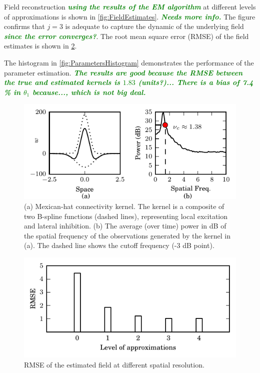 \documentclass[journal,a4paper]{IEEEtran}
\newcommand{\dean}[1]{\textsf{\emph{\textbf{\textcolor{green}{#1}}}}}
\begin{document}
Field reconstruction \dean{using the results of the EM algorithm} at different levels of approximations is shown in \figurename{\ref{fig:FieldEstimates}}. \dean{Needs more info.} The figure confirms that $j=3$ is adequate to capture the dynamic of the underlying field \dean{since the error converges?}. The root mean square error (RMSE) of the field estimates is shown in \figurename{\ref{fig:RMSE}}. 

The histogram in \figurename{\ref{fig:ParametersHistogram}} demonstrates the performance of the parameter estimation. \dean{The results are good because the RMSE between the true and estimated kernels is $1.83$ (units?)... There is a bias of 7.4 \% in $\theta_1$ because..., which is not big deal.}
\begin{figure}[!h]
 \centering
 \includegraphics[scale=1]{./Graph/ObservationFreqResponse.pdf}
 \caption{(a) Mexican-hat connectivity kernel. The kernel is a composite of two B-spline
functions (dashed lines), representing local excitation and lateral inhibition. (b) The average (over time) power in dB of the spatial frequency of the observations generated by the kernel in (a). The dashed line shows the cutoff frequency (-3 dB point).}
\label{fig:KernelAndFreqResponse} 
  \end{figure} 
\begin{figure}[!h] 
 \centering
\includegraphics[scale=1]{./Graph/RMSE.pdf}
 \caption{RMSE of the estimated field at different spatial resolution.}
 \label{fig:RMSE}
 \end{figure} 
\end{document}
